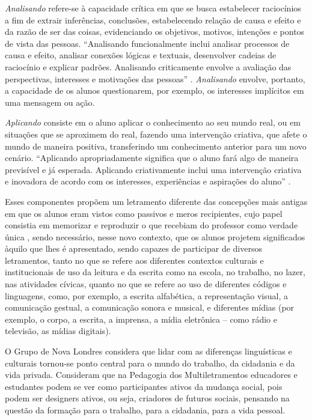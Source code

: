 \documentclass{textolivre}
\begin{document}
\emph{Analisando} refere-se à capacidade crítica em que se busca estabelecer
raciocínios a fim de extrair inferências, conclusões, estabelecendo relação de
causa e efeito e da razão de ser das coisas, evidenciando os objetivos,
motivos, intenções e pontos de vista das pessoas. “Analisando funcionalmente
inclui analisar processos de causa e efeito, analisar conexões lógicas e
textuais, desenvolver cadeias de raciocínio e explicar padrões. Analisando
criticamente envolve a avaliação das perspectivas, interesses e motivações das
pessoas” \cite[p. 31]{raulik2916}. \emph{Analisando} envolve, portanto, a capacidade de
os alunos questionarem, por exemplo, os interesses implícitos em uma mensagem
ou ação.

\emph{Aplicando} consiste em o aluno aplicar o conhecimento ao seu mundo real,
ou em situações que se aproximem do real, fazendo uma intervenção criativa, que
afete o mundo de maneira positiva, transferindo um conhecimento anterior para
um novo cenário. “Aplicando apropriadamente significa que o aluno fará algo de
maneira previsível e já esperada. Aplicando criativamente inclui uma
intervenção criativa e inovadora de acordo com os interesses, experiências e
aspirações do aluno” \cite[p. 31]{raulik2916}.

Esses componentes propõem um letramento diferente das concepções mais antigas
em que os alunos eram vistos como passivos e meros recipientes, cujo papel
consistia em memorizar e reproduzir o que recebiam do professor como verdade
única \cite{cope2009}, sendo necessário, nesse novo contexto, que os alunos
projetem significados àquilo que lhes é apresentado, sendo capazes de
participar de diversos letramentos, tanto no que se refere aos diferentes
contextos culturais e institucionais de uso da leitura e da escrita como na
escola, no trabalho, no lazer, nas atividades cívicas, quanto no que se refere
ao uso de diferentes códigos e linguagens, como, por exemplo, a escrita
alfabética, a representação visual, a comunicação gestual, a comunicação sonora
e musical, e diferentes mídias (por exemplo, o corpo, a escrita, a imprensa, a
mídia eletrônica – como rádio e televisão, as mídias digitais).

O Grupo de Nova Londres considera que lidar com as diferenças linguísticas e
culturais tornou-se ponto central para o mundo do trabalho, da cidadania e da
vida privada. Consideram que na Pedagogia dos Multiletramentos educadores e
estudantes podem se ver como participantes ativos da mudança social, pois podem
ser designers ativos, ou seja, criadores de futuros sociais, pensando na
questão da formação para o trabalho, para a cidadania, para a vida pessoal.
\end{document}
